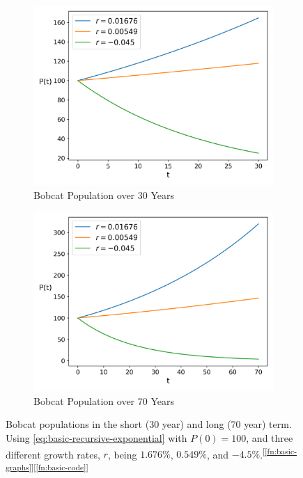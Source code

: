 \documentclass{article}
\begin{document}
\begin{figure}[h]
    \centering
    \begin{subfigure}{.5\textwidth}
        \centering
        \includegraphics[width=.95\linewidth]{./basic/short_term.png}
        \caption{Bobcat Population over 30 Years}
        \label{fig:basic-short-term}
    \end{subfigure}%
    \begin{subfigure}{.5\textwidth}
        \centering
        \includegraphics[width=.95\linewidth]{./basic/long_term.png}
        \caption{Bobcat Population over 70 Years}
        \label{fig:basic-long-term}
    \end{subfigure}
    \caption{Bobcat populations in the short (30 year) and long (70 year) term. Using \cref{eq:basic-recursive-exponential} with $P(0) = 100$, and three different growth rates, $r$, being $1.676\%$, $0.549\%$, and $-4.5\%$.\textsuperscript{[\protect\ref{fn:basic-graphs}][\protect\ref{fn:basic-code}]}}
    \label{fig:1}
\end{figure}
\end{document}
